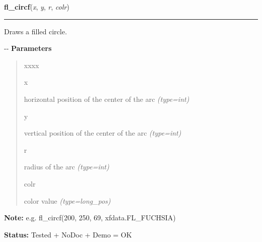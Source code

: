     \vspace{0.5ex}

\hspace{.8\funcindent}\begin{boxedminipage}{\funcwidth}

    \raggedright \textbf{fl\_circf}(\textit{x}, \textit{y}, \textit{r}, \textit{colr})

    \vspace{-1.5ex}

    \rule{\textwidth}{0.5\fboxrule}
\setlength{\parskip}{2ex}

Draws a filled circle.

-{}-
\setlength{\parskip}{1ex}
      \textbf{Parameters}
      \vspace{-1ex}

      \begin{quote}
        \begin{Ventry}{xxxx}

          \item[x]


horizontal position of the center of the arc
            {\it (type=int)}

          \item[y]


vertical position of the center of the arc
            {\it (type=int)}

          \item[r]


radius of the arc
            {\it (type=int)}

          \item[colr]


color value
            {\it (type=long\_pos)}

        \end{Ventry}

      \end{quote}

\textbf{Note:} 
e.g. fl\_circf(200, 250, 69, xfdata.FL\_FUCHSIA)


\textbf{Status:} 
Tested + NoDoc + Demo = OK


    \end{boxedminipage}

    \label{xformslib:flxbasic:fl_circ}

    \vspace{0.5ex}

